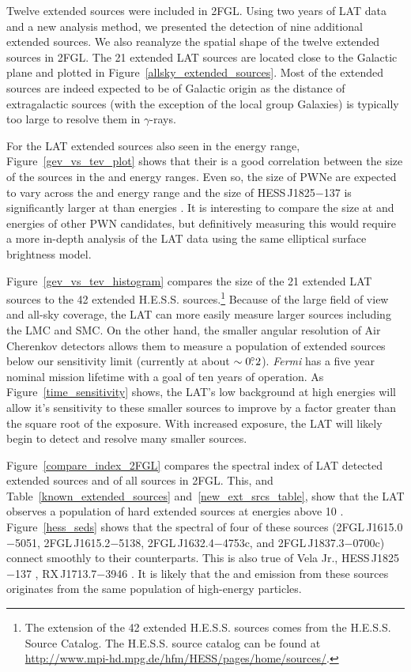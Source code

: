 \documentclass[12pt,preprint]{aastex}
\newcommand{\gev}{\text{GeV}\xspace}
\newcommand{\tev}{\text{TeV}\xspace}
\newcommand{\fermi}{\textit{Fermi}\xspace}
\newcommand{\hl}[1]{#1}
\begin{document}
\hl{
Twelve extended sources were included in 2FGL.  Using two years of
LAT data and a new analysis method, we presented the detection of
nine additional extended sources. We also reanalyze the spatial
shape of the twelve extended sources in 2FGL.  The 21 extended
LAT sources are located close to the Galactic plane and plotted in
Figure~\ref{allsky_extended_sources}.  Most of the extended sources are
indeed expected to be of Galactic origin as the distance of extragalactic
sources (with the exception of the local group Galaxies) is typically too
large to resolve them in $\gamma$-rays.

For the LAT extended sources also seen in the \tev energy range,
Figure~\ref{gev_vs_tev_plot} shows that their is a good correlation
between the size of the sources in the \gev and \tev energy ranges. Even
so, the size of PWNe are expected to vary across the \gev and \tev
energy range and the size of HESS\,J1825$-$137 is significantly larger at
\gev than \tev energies \citep{fermi_hess_j1825}.  It is interesting to
compare the size at \gev and \tev energies
of other PWN candidates, but definitively
measuring this would require a more in-depth analysis of the LAT data
using the same elliptical surface brightness model.

Figure~\ref{gev_vs_tev_histogram} compares the size of the 21 extended
LAT sources to the 42 extended H.E.S.S. sources.\footnote{The 
\tev extension of
the 42 extended H.E.S.S. sources comes from the H.E.S.S. Source
Catalog. The H.E.S.S. source catalog can be found at \url{http://www.mpi-hd.mpg.de/hfm/HESS/pages/home/sources/}.}
Because of the large
field of view and all-sky coverage, the LAT can more easily measure
larger sources including the LMC and SMC.  On the other hand, the smaller
angular resolution of Air Cherenkov detectors allows them to measure a
population of extended sources below our sensitivity limit (currently at
about $\sim0\mbox{$.\!\!^\circ$}2$).  \fermi has a five year nominal mission lifetime with
a goal of ten years of operation.  As Figure~\ref{time_sensitivity} shows,
the LAT's low background at high energies will allow it's sensitivity to
these smaller sources to improve by a factor greater than the square root
of the exposure.  With increased exposure, the LAT will likely begin to
detect and resolve many smaller \tev sources.

Figure~\ref{compare_index_2FGL} compares the spectral index
of LAT detected extended sources and of all sources in 2FGL. This,
and Table~\ref{known_extended_sources} and~\ref{new_ext_srcs_table},
show that the LAT observes a population of hard extended sources at
energies above 10 \gev.  Figure~\ref{hess_seds} shows that the
\gev spectral of
four of these sources (2FGL\,J1615.0$-$5051, 2FGL\,J1615.2$-$5138,
2FGL\,J1632.4$-$4753c, and 2FGL\,J1837.3$-$0700c)  
connect smoothly to their \tev counterparts. This is also true of Vela
Jr., HESS\,J1825$-$137 \citep{fermi_hess_j1825}, RX\,J1713.7$-$3946
\citep{rx_j1713_lat}.  It is likely that the \gev and \tev emission
from these sources originates from the same population of high-energy
particles.

}
\end{document}
